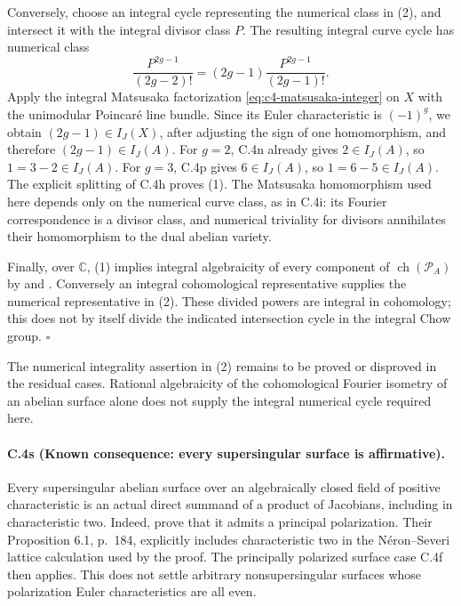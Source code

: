 Conversely, choose an integral cycle representing the numerical
class in (2), and intersect it with the integral divisor class
$P$. The resulting integral curve cycle has numerical class
\[
 \frac{P^{2g-1}}{(2g-2)!}
       =(2g-1)\frac{P^{2g-1}}{(2g-1)!}.
\]
Apply the integral Matsusaka factorization
\eqref{eq:c4-matsusaka-integer} on $X$ with the unimodular
Poincar\'e line bundle. Since its Euler characteristic is
$(-1)^g$, we obtain $(2g-1)\in I_J(X)$, after adjusting the
sign of one homomorphism, and therefore $(2g-1)\in I_J(A)$.
For $g=2$, C.4n already gives $2\in I_J(A)$, so
$1=3-2\in I_J(A)$. For $g=3$, C.4p gives
$6\in I_J(A)$, so $1=6-5\in I_J(A)$.
The explicit splitting of C.4h proves (1).
The Matsusaka homomorphism used here depends only on the
numerical curve class, as in C.4i: its Fourier correspondence
is a divisor class, and numerical triviality for divisors
annihilates their homomorphism to the dual abelian variety.

Finally, over $\mathbb C$, (1) implies integral algebraicity
of every component of $\operatorname{ch}(\mathcal P_A)$ by
\citet[Theorem 1.4]{cyVoisin2024} and
\citet[Theorem 1.1]{cyBeckmannFortman2023}. Conversely an
integral cohomological representative supplies the numerical
representative in (2). These divided powers are integral in
cohomology; this does not by itself divide the indicated
intersection cycle in the integral Chow group.
\hfill$\square$

The numerical integrality assertion in (2) remains to be proved
or disproved in the residual cases. Rational algebraicity of
the cohomological Fourier isometry of an abelian surface alone
does not supply the integral numerical cycle required here.

\paragraph{C.4s (Known consequence: every supersingular surface is affirmative).}
Every supersingular abelian surface over an algebraically closed
field of positive characteristic is an actual direct summand of
a product of Jacobians, including in characteristic two.
Indeed, \citet[Lemma 6.2, p.~185]{frC4FuLi2021} prove that it
admits a principal polarization. Their Proposition 6.1,
p.~184, explicitly includes characteristic two in the
N\'eron--Severi lattice calculation used by the proof.
The principally polarized surface case C.4f then applies.
This does not settle arbitrary nonsupersingular surfaces whose
polarization Euler characteristics are all even.
